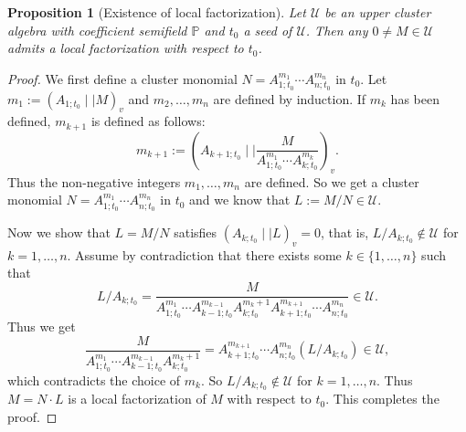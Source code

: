 \documentclass{amsart}
\newtheorem{proposition}[theorem]{Proposition}
\theoremstyle{definition}
\theoremstyle{remark}
\numberwithin{equation}{section}
\begin{document}
\begin{proposition}[Existence of local factorization] \label{proexist} Let $\mathcal U$ be an upper cluster algebra with coefficient semifield $\mathbb P$ and $t_0$ a seed of $\mathcal U$. Then any $0\neq M\in\mathcal U$ admits a local factorization with respect to $t_0$.
\end{proposition}
\begin{proof}
We first define a cluster monomial $N=A_{1;t_0}^{m_1}\cdots A_{n;t_0}^{m_n}$ in $t_0$.  Let $m_1:=(A_{1;t_0}\mid\mid  M)_v$ and  $m_2,\ldots,m_n$ are defined by induction. If $m_{k}$ has been defined, $m_{k+1}$ is defined as follows:
$$m_{k+1}:=(A_{k+1;t_0}\mid\mid  \frac{M}{A_{1;t_0}^{m_1}\cdots A_{k;t_0}^{m_k}})_v.$$
Thus the non-negative integers $m_1,\ldots,m_n$ are defined. So we get a cluster monomial $N=A_{1;t_0}^{m_1}\cdots A_{n;t_0}^{m_n}$ in $t_0$ and we know that $L:=M/N\in\mathcal U$.

Now we show that $L=M/N$ satisfies $(A_{k;t_0}\mid\mid  L)_v=0$, that is, $L/A_{k;t_0}\notin\mathcal U$ for $k=1,\ldots,n$. Assume by contradiction that there exists some $k\in\{1,\ldots,n\}$ such that
$$L/A_{k;t_0}=\frac{M}{A_{1;t_0}^{m_1}\cdots A_{k-1;t_0}^{m_{k-1}}A_{k;t_0}^{m_k+1}A_{k+1;t_0}^{m_{k+1}}\cdots A_{n;t_0}^{m_n}}\in\mathcal U.$$
Thus we get $$\frac{M}{A_{1;t_0}^{m_1}\cdots A_{k-1;t_0}^{m_{k-1}}A_{k;t_0}^{m_k+1}}=A_{k+1;t_0}^{m_{k+1}}\cdots A_{n;t_0}^{m_n}(L/A_{k;t_0})\in\mathcal U,$$
which contradicts the choice of $m_k$. So $L/A_{k;t_0}\notin\mathcal U$ for $k=1,\ldots,n$. Thus $M=N\cdot L$ is a local factorization of $M$ with respect to $t_0$.
This completes the proof.
\end{proof}
\end{document}
